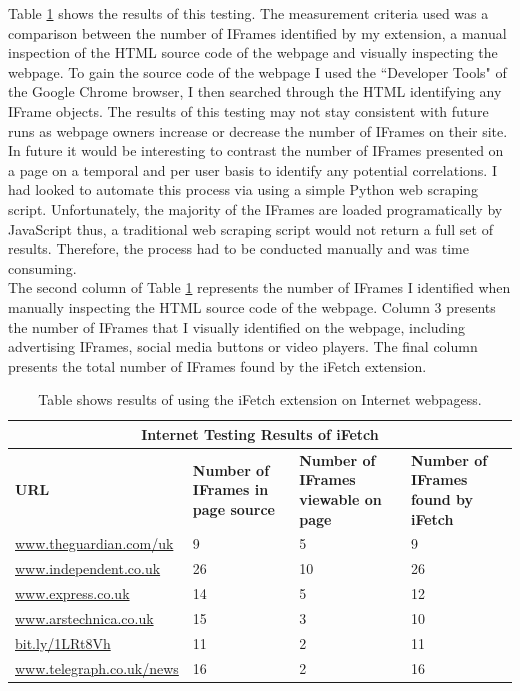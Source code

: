 \documentclass[12pt]{article}
\begin{document}
Table \ref{table:3} shows the results of this testing. The measurement criteria used was a comparison between the number of IFrames identified by my extension, a manual inspection of the HTML source code of the webpage and visually inspecting the webpage. To gain the source code of the webpage I used the ``Developer Tools" of the Google Chrome browser, I then searched through the HTML identifying any IFrame objects. The results of this testing may not stay consistent with future runs as webpage owners increase or decrease the number of IFrames on their site. In future it would be interesting to contrast the number of IFrames presented on a page on a temporal and per user basis to identify any potential correlations. I had looked to automate this process via using a simple Python web scraping script. Unfortunately, the majority of the IFrames are loaded programatically by JavaScript thus, a traditional web scraping script would not return a full set of results. Therefore, the process had to be conducted manually and was time consuming. \\

The second column of Table \ref{table:3} represents the number of IFrames I identified when manually inspecting the HTML source code of the webpage. Column 3 presents the number of IFrames that I visually identified on the webpage, including advertising IFrames, social media buttons or video players. The final column presents the total number of IFrames found by the iFetch extension.    

{
\begin{table} [H]
\centering
\begin{tabular}{ |p{4cm}|p{3cm}|p{3cm}| p{3cm} | }
\hline
\multicolumn{4}{|c|}{\textbf{Internet Testing Results of iFetch}} \\
\hline
\textbf{URL} & \textbf{Number of IFrames in page source} & \textbf{Number of IFrames viewable on page} & \textbf{Number of IFrames found by iFetch} \\
\hline
\url{www.theguardian.com/uk} & 9 & 5 & 9 \\
\hline
\url{www.independent.co.uk} & 26 & 10 & 26 \\
\hline
\url{www.express.co.uk} & 14 & 5 & 12 \\
\hline
\url{www.arstechnica.co.uk} & 15 & 3 & 10  \\
\hline
\url{bit.ly/1LRt8Vh} & 11 & 2 & 11 \\
\hline
\url{www.telegraph.co.uk/news} & 16 & 2 & 16\\
\hline
\end{tabular}
\caption{Table shows results of using the iFetch extension on Internet webpagess.}
\label{table:3}
\end{table}
}
\end{document}
